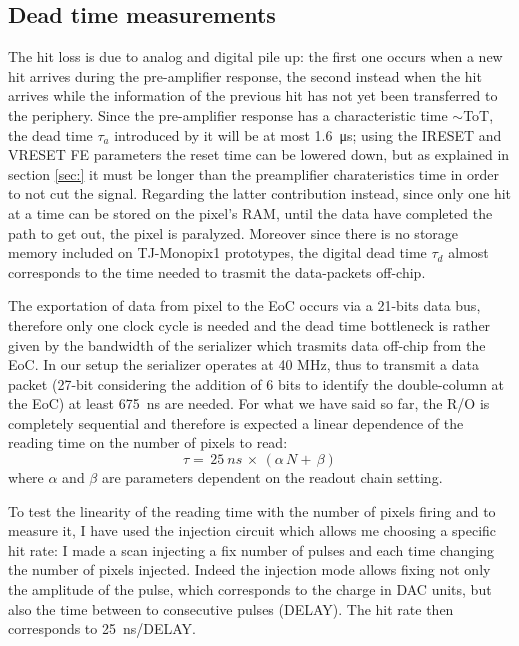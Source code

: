     \subsection{Dead time measurements}
        The hit loss is due to analog and digital pile up: the first one occurs when a new hit arrives during the pre-amplifier response, the second instead when the hit arrives while the information of the previous hit has not yet been transferred to the periphery.  
        Since the pre-amplifier response has a characteristic time $\sim$ToT, the dead time $\tau_{a}$ introduced by it will be at most \SI{1.6}{\us}; using the IRESET and VRESET FE parameters the reset time can be lowered down, but as explained in section \ref{sec:} it must be longer than the preamplifier charateristics time in order to not cut the signal.   
        Regarding the latter contribution instead, since only one hit at a time can be stored on the pixel's RAM, until the data have completed the path to get out, the pixel is paralyzed. Moreover since there is no storage memory included on TJ-Monopix1 prototypes, the digital dead time $\tau_{d}$ almost corresponds to the time needed to trasmit the data-packets off-chip. 

        The exportation of data from pixel to the EoC occurs via a 21-bits data bus, therefore only one clock cycle is needed and the dead time bottleneck is rather given by the bandwidth of the serializer which trasmits data off-chip from the EoC. In our setup the serializer operates at 40 MHz, thus to transmit a data packet (27-bit considering the addition of 6 bits to identify the double-column at the EoC) at least \SI{675}{ns} are needed. 
        For what we have said so far, the R/O is completely sequential and therefore is expected a linear dependence of the reading time on the number of pixels to read:
        \begin{equation}
            \tau =\, 25\: \unit{ns}\, \times\, (\alpha\, N +\, \beta)
            \label{eq:reading_time}
        \end{equation}
        where $\alpha$ and $\beta$ are parameters dependent on the readout chain setting. 
        
        To test the linearity of the reading time with the number of pixels firing and to measure it, I have used the injection circuit which allows me choosing a specific hit rate: I made a scan injecting a fix number of pulses and each time changing the number of pixels injected.
        Indeed the injection mode allows fixing not only the amplitude of the pulse, which corresponds to the charge in DAC units, but also the time between to consecutive pulses (DELAY). The hit rate then corresponds to \SI{25}{ns}/DELAY.

